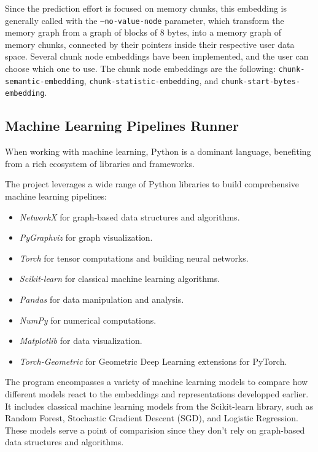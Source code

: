 Since the prediction effort is focused on memory chunks, this embedding is generally called with the \texttt{--no-value-node} parameter, which transform the memory graph from a graph of blocks of 8 bytes, into a memory graph of memory chunks, connected by their pointers inside their respective user data space. Several chunk node embeddings have been implemented, and the user can choose which one to use. The chunk node embeddings are the following: \texttt{chunk-semantic-embedding}, \texttt{chunk-statistic-embedding}, and \texttt{chunk-start-bytes-embedding}.

\subsection{Machine Learning Pipelines Runner}

When working with machine learning, Python is a dominant language, benefiting from a rich ecosystem of libraries and frameworks.

The project leverages a wide range of Python libraries to build comprehensive machine learning pipelines:
\begin{itemize}
    \item \textit{NetworkX} for graph-based data structures and algorithms.
    \item \textit{PyGraphviz} for graph visualization.
    \item \textit{Torch} for tensor computations and building neural networks.
    \item \textit{Scikit-learn} for classical machine learning algorithms.
    \item \textit{Pandas} for data manipulation and analysis.
    \item \textit{NumPy} for numerical computations.
    \item \textit{Matplotlib} for data visualization.
    \item \textit{Torch-Geometric} for Geometric Deep Learning extensions for PyTorch.
\end{itemize}

The program encompasses a variety of machine learning models to compare how different models react to the embeddings and representations developped earlier. It includes classical machine learning models from the Scikit-learn library, such as Random Forest, Stochastic Gradient Descent (SGD), and Logistic Regression. These models serve a point of comparision since they don't rely on graph-based data structures and algorithms. 

